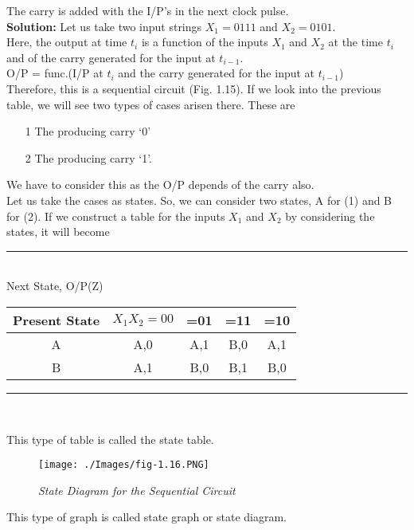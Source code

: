 \documentclass[10.5pt]{article}
\begin{document}
\noindent The carry is added with the I/P’s in the next clock pulse.\\
\noindent \textbf{Solution:} Let us take two input strings $X_{1}=0111$ and $X_{2}=0101$.\\
\indent Here, the output at time $t_{i}$ is a function of the inputs $X_{1}$ and $X_{2}$ at the time $t_{i}$ and of the carry generated for the input at $t_{i-1}$.\\
O/P = func.(I/P at $t_{i}$ and the carry generated for
the input at $t_{i-1}$)\\
Therefore, this is a sequential circuit (Fig. 1.15).
If we look into the previous table, we will see
two types of cases arisen there. These are
\begin{enumerate}
		\item[1] The producing carry ‘0’
		\item[2] The producing carry ‘1’.
\end{enumerate}
\indent\indent We have to consider this as the O/P depends of the carry also.\\
\indent Let us take the cases as states. So, we can consider two states, A for (1) and B for (2). If we construct
a table for the inputs $X_{1}$ and $X_{2}$ by considering the states, it will become
\begin{center}
\noindent\rule{7.8cm}{1.2pt}\\
Next State, O/P(Z)
\end{center}
\begin{center}
	\begin{tabular}{ c c c c c} 		
		\hline
		Present State & $X_{1}X_{2} = 00$ & =01 & =11 & =10 \\
		\hline
		A & A,0 & A,1 & B,0 & A,1 \\
		\hline
		B & A,1 & B,0 & B,1 & B,0 \\
	\end{tabular}
\end{center}
\begin{center}
\noindent\rule{7.8cm}{1.2pt}\\
\end{center}
\noindent This type of table is called the state table.
\begin{wrapfigure}{!h!}{1\textwidth}
	\begin{center}	
		\texttt{[image: ./Images/fig-1.16.PNG]}
			\caption{\textit{State Diagram for the Sequential Circuit}}
  	\end{center}
\end{wrapfigure}
This type of graph is called state graph or state diagram.
\clearpage
\end{document}
